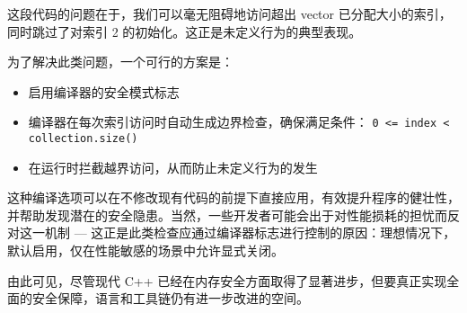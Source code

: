 这段代码的问题在于，我们可以毫无阻碍地访问超出 vector 已分配大小的索引，同时跳过了对索引 2 的初始化。这正是未定义行为的典型表现。

为了解决此类问题，一个可行的方案是：

\begin{itemize}
\item 
启用编译器的安全模式标志

\item 
编译器在每次索引访问时自动生成边界检查，确保满足条件： \verb|0 <= index < collection.size()|

\item 
在运行时拦截越界访问，从而防止未定义行为的发生
\end{itemize}

这种编译选项可以在不修改现有代码的前提下直接应用，有效提升程序的健壮性，并帮助发现潜在的安全隐患。当然，一些开发者可能会出于对性能损耗的担忧而反对这一机制 --- 这正是此类检查应通过编译器标志进行控制的原因：理想情况下，默认启用，仅在性能敏感的场景中允许显式关闭。

由此可见，尽管现代 C++ 已经在内存安全方面取得了显著进步，但要真正实现全面的安全保障，语言和工具链仍有进一步改进的空间。